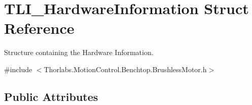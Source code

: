 \hypertarget{struct_t_l_i___hardware_information}{}\section{T\+L\+I\+\_\+\+Hardware\+Information Struct Reference}
\label{struct_t_l_i___hardware_information}


Structure containing the Hardware Information.  




{\ttfamily \#include $<$Thorlabs.\+Motion\+Control.\+Benchtop.\+Brushless\+Motor.\+h$>$}

\subsection*{Public Attributes}
